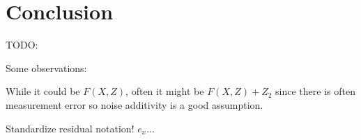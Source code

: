 \chapter{Conclusion}

TODO:

Some observations:

While it could be $F(X, Z)$, often it might be $F(X, Z) + Z_2$ since there is often measurement error
so noise additivity is a good assumption. 

Standardize residual notation! $e_x$...


